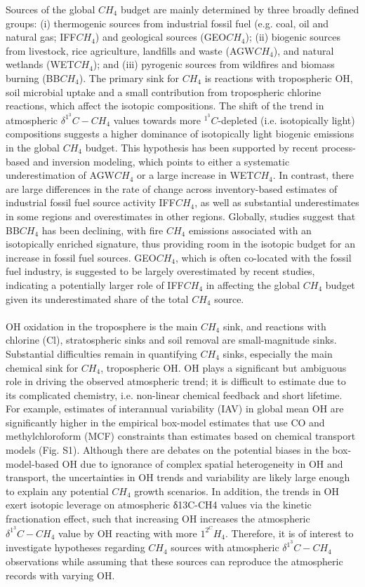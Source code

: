 \documentclass[a4paper,12pt]{article}
\begin{document}
\small{Sources of the global $CH_{4}$ budget are mainly determined by three broadly defined groups: (i) thermogenic sources from industrial fossil fuel (e.g. coal, oil and natural gas; IFF$CH_{4}$) and geological sources (GEO$CH_{4}$); (ii) biogenic sources from livestock, rice agriculture, landfills and waste (AGW$CH_{4}$), and natural wetlands (WET$CH_{4}$); and (iii) pyrogenic sources from wildfires and biomass burning (BB$CH_{4}$). The primary sink for $CH_{4}$ is reactions with tropospheric OH, soil microbial uptake and a small contribution from tropospheric chlorine reactions, which affect the isotopic compositions. The shift of the trend in atmospheric $\delta ^1^3C-CH_{4}$ values towards more $^1^3C$-depleted (i.e. isotopically light) compositions suggests a higher dominance of isotopically light biogenic emissions in the global $CH_{4}$ budget. This hypothesis has been supported by recent process-based and inversion modeling, which points to either a systematic underestimation of AGW$CH_{4}$ or a large increase in WET$CH_{4}$. In contrast, there are large differences in the rate of change across inventory-based estimates of industrial fossil fuel source activity IFF$CH_{4}$, as well as substantial underestimates in some regions and overestimates in other regions. Globally, studies suggest that BB$CH_{4}$ has been declining, with fire $CH_{4}$ emissions associated with an isotopically enriched signature, thus providing room in the isotopic budget for an increase in fossil fuel sources. GEO$CH_{4}$, which is often co-located with the fossil fuel industry, is suggested to be largely overestimated by recent studies, indicating a potentially larger role of IFF$CH_{4}$ in affecting the global $CH_{4}$ budget given its underestimated share of the total $CH_{4}$ source.}
\\\\
\small{OH oxidation in the troposphere is the main $CH_{4}$ sink, and reactions with chlorine (Cl), stratospheric sinks and soil removal are small-magnitude sinks. Substantial difficulties remain in quantifying $CH_{4}$ sinks, especially the main chemical sink for  $CH_{4}$, tropospheric OH. OH plays a significant but ambiguous role in driving the observed atmospheric trend; it is difficult to estimate due to its complicated chemistry, i.e. non-linear chemical feedback and short lifetime. For example, estimates of interannual variability (IAV) in global mean OH are significantly higher in the empirical box-model estimates that use CO and methylchloroform (MCF) constraints than estimates based on chemical transport models (Fig. S1). Although there are debates on the potential biases in the box-model-based OH due to ignorance of complex spatial heterogeneity in OH and transport, the uncertainties in OH trends and variability are likely large enough to explain any potential $CH_{4}$ growth scenarios. In addition, the trends in OH exert isotopic leverage on atmospheric δ13C-CH4 values via the kinetic fractionation effect, such that increasing OH increases the atmospheric $\delta ^1^3C-CH_{4}$ value by OH reacting with more  $1^2^CH_{4}$. Therefore, it is of interest to investigate hypotheses regarding $CH_{4}$ sources with atmospheric $\delta ^1^3C-CH_{4}$ observations while assuming that these sources can reproduce the atmospheric records with varying OH.}
\end{document}
